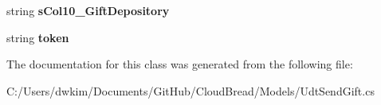 \begin{DoxyCompactItemize}
\item 
string {\bfseries s\+Col10\+\_\+\+Gift\+Depository}\hypertarget{a00114_ab3a851660e3181f46d8e28c4d396a6e1}{}\label{a00114_ab3a851660e3181f46d8e28c4d396a6e1}

\item 
string {\bfseries token}\hypertarget{a00114_a714251fe2dced02c15e983dd39b54902}{}\label{a00114_a714251fe2dced02c15e983dd39b54902}

\end{DoxyCompactItemize}


The documentation for this class was generated from the following file\+:\begin{DoxyCompactItemize}
\item 
C\+:/\+Users/dwkim/\+Documents/\+Git\+Hub/\+Cloud\+Bread/\+Models/Udt\+Send\+Gift.\+cs\end{DoxyCompactItemize}
